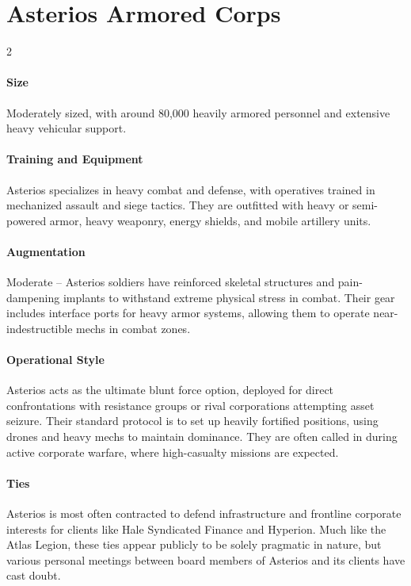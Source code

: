 \section*{Asterios Armored Corps}
\vspace{5mm}
\begin{multicols}{2}
\paragraph{Size}
Moderately sized, with around 80,000 heavily armored personnel and extensive heavy vehicular support. 
\paragraph{Training and Equipment}
Asterios specializes in heavy combat and defense, with operatives trained in mechanized assault and siege tactics. They are outfitted with heavy or semi-powered armor, heavy weaponry, energy shields, and mobile artillery units.
\paragraph{Augmentation}
Moderate – Asterios soldiers have reinforced skeletal structures and pain-dampening implants to withstand extreme physical stress in combat. Their gear includes interface ports for heavy armor systems, allowing them to operate near-indestructible mechs in combat zones.
\paragraph{Operational Style}
Asterios acts as the ultimate blunt force option, deployed for direct confrontations with resistance groups or rival corporations attempting asset seizure. Their standard protocol is to set up heavily fortified positions, using drones and heavy mechs to maintain dominance. They are often called in during active corporate warfare, where high-casualty missions are expected.
\paragraph{Ties}
Asterios is most often contracted to defend infrastructure and frontline corporate interests for clients like Hale Syndicated Finance and Hyperion.
Much like the Atlas Legion, these ties appear publicly to be solely pragmatic in nature, but various personal meetings between board members of Asterios and its clients have cast doubt.
\end{multicols}


